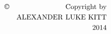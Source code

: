 \begin{titlepage} %
\null
\vfill
\begin{singlespace}
\begin{eqnarray*}
\copyright && \mathrm{Copyright~by} \\
&&\mathrm{ALEXANDER~LUKE~KITT} \\
&&\mathrm{2014}
\end{eqnarray*}
\end{singlespace}

\end{titlepage}